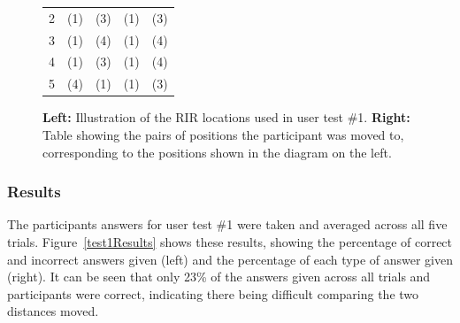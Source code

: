 \documentclass[../../main.tex]{subfiles}
\begin{document}
\begin{figure}[H]
\begin{minipage}{0.5\textwidth}
\begin{table}[H]
\begin{tabular}{|c|cc|cc|}
				          2 & (1) & (3) & (1) & (3)\\
				          3 & (1) & (4) & (1) & (4)\\ \hline
				          4 & (1) & (3) & (1) & (4)\\ 
				          5 & (4) & (1) & (1) & (3)\\ \hline
				    \end{tabular}
				\end{table}
				\end{minipage}
				\caption{\textbf{Left:} Illustration of the \ac{RIR} locations used in user test \#1. \textbf{Right:} Table showing the pairs of positions the participant was moved to, corresponding to the positions shown in the diagram on the left.}
				\label{test1}
			\end{figure}

		\subsubsection{Results}
			The participants answers for user test \#1 were taken and averaged across all five trials. Figure~\ref{test1Results} shows these results, showing the percentage of correct and incorrect answers given (left) and the percentage of each type of answer given (right). It can be seen that only 23\% of the answers given across all trials and participants were correct, indicating there being difficult comparing the two distances moved.
\end{document}
